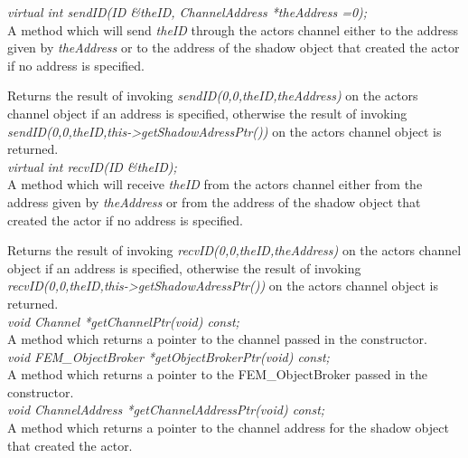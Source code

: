{\em virtual int sendID(ID \&theID, ChannelAddress
*theAddress =0);}\\
A method which will send {\em theID} 
through the actors channel either to the address given by {\em
theAddress} or to the address of the shadow object that created the
actor if no address is specified.

Returns the result of invoking {\em sendID(0,0,theID,theAddress)} on
the actors channel object if an address is specified, otherwise
the result of invoking {\em
sendID(0,0,theID,this->getShadowAdressPtr())} on the actors channel
object is returned. \\ 


{\em virtual int recvID(ID \&theID);} \\
A method which will receive {\em theID} from
the actors channel either from the address given by {\em
theAddress} or from the address of the shadow object that created the
actor if no address is specified.

Returns the result of invoking {\em recvID(0,0,theID,theAddress)} on
the actors channel object if an address is specified, otherwise
the result of invoking {\em
recvID(0,0,theID,this->getShadowAdressPtr())} on the actors channel
object is returned. \\ 

{\em void Channel *getChannelPtr(void) const;}\\
A method which returns a pointer to the channel passed in the
constructor. \\

{\em void FEM\_ObjectBroker *getObjectBrokerPtr(void) const;}\\
A method which returns a pointer to the FEM\_ObjectBroker passed in the
constructor. \\

{\em void ChannelAddress *getChannelAddressPtr(void) const;}\\
A method which returns a pointer to the channel address for the shadow
object that created the actor. \\


